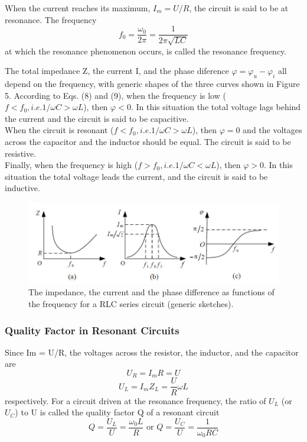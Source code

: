 \documentclass{article}
\begin{document}
When the current reaches its maximum, $ I_m = U/R $, the circuit is said to be at resonance. The frequency
$$ f_0=\dfrac{\omega_0}{2\pi}=\dfrac{1}{2\pi\sqrt{LC}} $$
at which the resonance phenomenon occurs, is called the resonance frequency.

The total impedance Z, the current I, and the phase diference $ \varphi = \varphi_u-\varphi_i $ all depend on the frequency, with generic shapes of the three curves shown in Figure 5. According to Eqs. (8) and (9), when the frequency is low ($ f < f_0, i.e. 1/\omega C > \omega L $), then $ \varphi < 0 $. In this situation the total voltage lags behind the current and the circuit is said to be capacitive.\\

When the circuit is resonant ($ f < f_0, i.e. 1/\omega C > \omega L $), then $ \varphi= 0 $ and the voltages
across the capacitor and the inductor should be equal. The circuit is said to be resistive.\\

Finally, when the frequency is high ($ f > f_0, i.e. 1/\omega C < \omega L $), then $ \varphi > 0 $. In this situation the total voltage leads the current, and the circuit is said to be inductive.

\begin{figure}[H]
	\centering
	\includegraphics[scale=0.6]{fig5.jpg}
	\caption{The impedance, the current and the phase difference as functions of the frequency for a RLC series circuit (generic sketches).}
\end{figure}
\subsubsection{Quality Factor in Resonant Circuits}
Since Im = U/R, the voltages across the resistor, the inductor, and the capacitor are
$$ U_R=I_mR=U $$
$$ U_L=I_mZ_L=\dfrac{U}{R}\omega L $$
respectively. For a circuit driven at the resonance frequency, the ratio of $ U_L $ (or $ U_C $) to U is called the quality factor Q of a resonant circuit
$$ Q=\dfrac{U_L}{U}=\dfrac{\omega_0 L}{R}\text{  or  } Q=\dfrac{U_C}{U}=\dfrac{1}{\omega_0RC} $$
\end{document}
